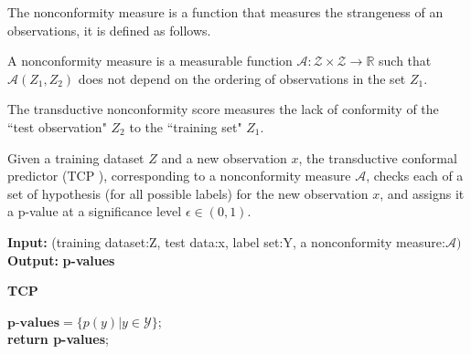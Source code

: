 \documentclass[main]{subfiles}
\begin{document}
The nonconformity measure is a function that measures the strangeness of an observations, it is defined as follows. 
\begin{definition} 
A nonconformity measure is a measurable function $\mathcal{A} : \mathcal{Z} \times \mathcal{Z}  \rightarrow \mathbb{R}$ such that $\mathcal{A}(Z_1 , Z_2 )$ does not depend on the ordering of observations in the set $Z_1$. 
\end{definition}

\begin{definition}
The transductive nonconformity score measures the lack of conformity of the ``test observation" $Z_2$ to the ``training set" $Z_1$.
\end{definition}

\begin{definition}
Given a training dataset $Z$ and a new observation $x$, the transductive conformal predictor (TCP ), corresponding to a nonconformity measure $\mathcal{A}$, checks each of a set of hypothesis (for all possible labels) for the new observation $x$, and assigns it a p-value at a significance level $\epsilon \in (0, 1)$.  %
\end{definition}


\begin{algorithm}[H]
 \textbf{Input:}{ (training dataset:Z, test data:x, label set:Y, a nonconformity measure:$\mathcal{A})$}\\
 \textbf{Output:}{\textbf{ p-values} }\\
 \caption{\textbf{TCP}}
 $\textbf{p-values} = \{ p(y)| y \in \mathcal{Y}\}$;\\
 \textbf{return \textbf{p-values}};\\
 \end{algorithm}
 
\end{document}
